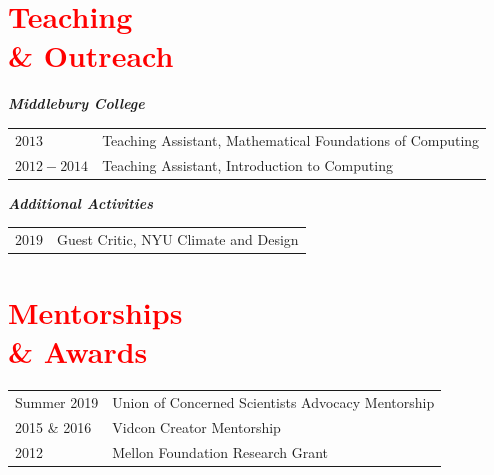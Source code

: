 \documentclass[margin, line, palatino, courier, 10pt]{res}
\begin{document}
\begin{resume}
	


\section{\sc \textcolor{Red}{\large{Teaching \\ \& Outreach}}}

\textit{\textbf{Middlebury College}}
\vspace*{0.05in}\\
\begin{tabular}{@{}p{1in}p{4in}}
$2013$ & Teaching Assistant, Mathematical Foundations of Computing \\
$2012 - 2014$ & Teaching Assistant, Introduction to Computing \\
\end{tabular}

\textit{\textbf{Additional Activities}}
\vspace*{0.05in}\\
\begin{tabular}{@{}p{1in}p{4in}}
$2019$ & Guest Critic, NYU Climate and Design \\
\end{tabular}

\section{\sc \textcolor{Red}{\large{Mentorships \\ \& Awards}}}
\vspace*{0.1in}
\begin{tabular}{@{}p{1in}p{4in}}
Summer 2019 & Union of Concerned Scientists Advocacy Mentorship\\
2015 \& 2016 &  Vidcon Creator Mentorship\\
2012 & Mellon Foundation Research Grant\\
\end{tabular}


\end{resume}
\end{document}

